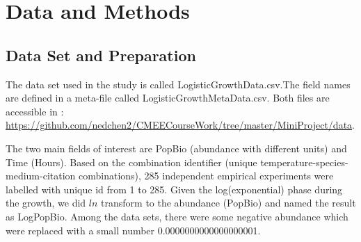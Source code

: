 \documentclass[11pt]{article}
\begin{document}
 \section{Data and Methods}
    \subsection{Data Set and Preparation}
    \linenumbers
    The data set used in the study is called LogisticGrowthData.csv.The field names are defined in a meta-file called LogisticGrowthMetaData.csv. Both files are accessible in :
    \newline    
    \href{https://github.com/nedchen2/CMEECourseWork/tree/master/MiniProject/data}{https://github.com/nedchen2/CMEECourseWork/tree/master/MiniProject/data}. 
   
    The two main fields of interest are PopBio (abundance with different units) and Time (Hours). Based on the combination identifier (unique temperature-species-medium-citation combinations), 285 independent empirical experiments were labelled with unique id from 1 to 285. Given the log(exponential) phase during the growth, we did $ln$ transform to the abundance (PopBio) and named the result as LogPopBio. Among the data sets, there were some negative abundance which were replaced with a small number 0.0000000000000000001.  

   
\end{document}
